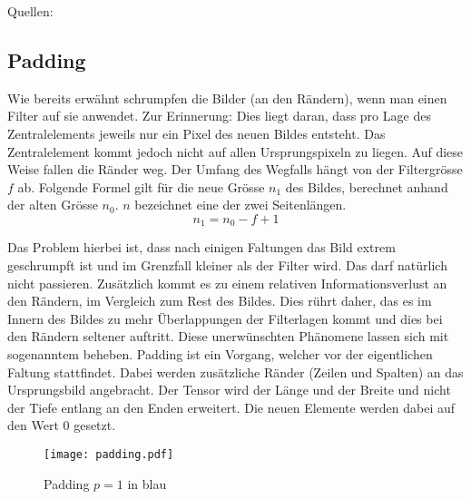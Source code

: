 \para{}
Quellen: \cite{Goodfellow-et-al-2016} \cite{deeplearning.ai:cnn}

\subsection{Padding}
Wie bereits erwähnt schrumpfen die Bilder (an den Rändern), wenn man einen Filter auf sie anwendet.
Zur Erinnerung: Dies liegt daran, dass pro Lage des Zentralelements jeweils nur ein Pixel
des neuen Bildes entsteht. Das Zentralelement kommt jedoch nicht auf allen
Ursprungspixeln zu liegen. Auf diese Weise fallen die Ränder weg. Der Umfang des
Wegfalls hängt von der Filtergrösse $f$ ab. Folgende Formel gilt für die
neue Grösse $n_1$ des Bildes, berechnet anhand der alten Grösse $n_0$. $n$ bezeichnet
eine der zwei Seitenlängen.
\begin{equation}
  n_1 = n_0 - f + 1
\end{equation}

Das Problem hierbei ist, dass nach einigen Faltungen das Bild extrem geschrumpft
ist und im Grenzfall kleiner als der Filter wird. Das darf natürlich nicht
passieren. Zusätzlich kommt es zu einem relativen Informationsverlust an den
Rändern, im Vergleich zum Rest des Bildes. Dies rührt daher,
das es im Innern des Bildes zu mehr Überlappungen der Filterlagen kommt und dies
bei den Rändern seltener auftritt.
\para{}
Diese unerwünschten Phänomene lassen sich mit sogenanntem  beheben. Padding ist ein
Vorgang, welcher vor der eigentlichen Faltung stattfindet. Dabei werden
zusätzliche Ränder (Zeilen und Spalten) an das Ursprungsbild angebracht. Der
Tensor wird der Länge und der Breite und nicht der Tiefe entlang an den
Enden erweitert. Die neuen Elemente werden dabei auf den Wert $0$ gesetzt.

\begin{figure}[h!]
  \centering
  \texttt{[image: padding.pdf]}
  \caption{Padding $p=1$ in blau}
\end{figure}

